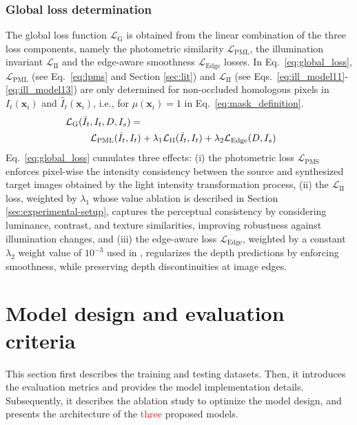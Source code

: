 \documentclass[a4paper,fleqn]{cas-dc}
\begin{document}
\subsubsection{Global loss determination}  
%
The global loss function $\mathcal{L}_{\textrm{G}}$ is obtained from the linear combination of the three loss components, namely the photometric similarity $\mathcal{L}_\textrm{PML}$, the illumination invariant $\mathcal{L}_\textrm{II}$ and the edge-aware smoothness $\mathcal{L}_{\textrm{Edge}}$ losses. In Eq.~\eqref{eq:global_loss}, $\mathcal{L}_\textrm{PML}$ (see Eq.~\eqref{eq:lpms} and Section \ref{sec:lit}) and $\mathcal{L}_\textrm{II}$ (see Eqs.~\eqref{eq:ill_model11}-\eqref{eq:ill_model13}) are only determined for non-occluded homologous pixels in $I_t(\mathbf{x}_i)$ and $\hat{I}_t(\mathbf{x}_i)$, i.e., for $\mu(\mathbf{x}_i) = 1$ in Eq.~\eqref{eq:mask_definition}. 
%
%
\begin{eqnarray} \label{eq:global_loss} \hspace{-6mm}
    \mathcal{L}_\textrm{G}(\hat{I}_{t},I_t,D, I_s) & = & \nonumber \\ & & \hspace{-22mm}
    \mathcal{L}_\textrm{PML}(\hat{I}_{t},I_t) + \lambda_1 \mathcal{L}_\textrm{II}(\hat{I}_t, I_t) + \lambda_2 \mathcal{L}_{\textrm{Edge}}(D, I_s)
\end{eqnarray}
%
%
Eq.~\eqref{eq:global_loss} cumulates three effects: (i) the photometric loss \( \mathcal{L}_{\text{PMS}} \) enforces pixel-wise the intensity consistency between the source and synthesized target images obtained by the light intensity transformation process, (ii) the  \( \mathcal{L}_\textrm{II} \) loss, weighted by \( \lambda_1 \) whose value ablation is described in Section \ref{sec:experimental-setup}, captures the perceptual consistency by considering luminance, contrast, and texture similarities, improving robustness against illumination changes, and (iii) the edge-aware loss \( \mathcal{L}_{\text{Edge}} \), weighted by a constant \( \lambda_2 \) weight value of \( 10^{-3} \) used in \citep{Godard_ICCV_2019,Shao_MIA_2022}, regularizes the depth predictions by enforcing smoothness, while preserving depth discontinuities at image edges.
%
%
\section{Model design and evaluation criteria\label{sec:experimental-setup}}
%
This section first describes the training and testing datasets. Then, it introduces the evaluation metrics and provides the model implementation details. Subsequently, it describes the ablation study to optimize the model design, and presents the architecture of the \textcolor{red}{three} proposed models.
%
\end{document}

